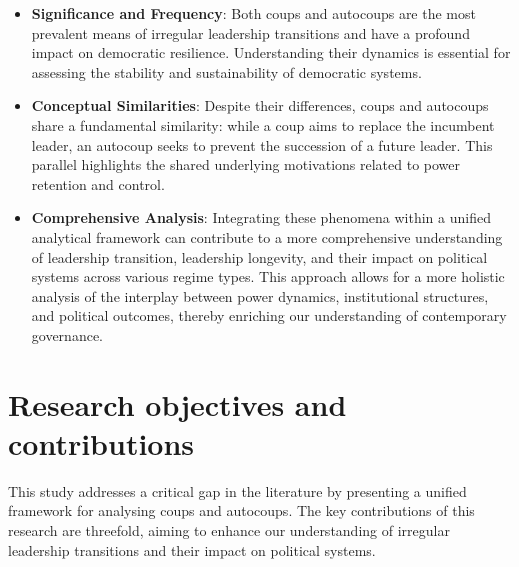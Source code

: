 \documentclass[
  12pt,
]{report}
\begin{document}
\begin{itemize}
\item
  \textbf{Significance and Frequency}: Both coups and autocoups are the
  most prevalent means of irregular leadership transitions and have a
  profound impact on democratic resilience. Understanding their dynamics
  is essential for assessing the stability and sustainability of
  democratic systems.
\item
  \textbf{Conceptual Similarities}: Despite their differences, coups and
  autocoups share a fundamental similarity: while a coup aims to replace
  the incumbent leader, an autocoup seeks to prevent the succession of a
  future leader. This parallel highlights the shared underlying
  motivations related to power retention and control.
\item
  \textbf{Comprehensive Analysis}: Integrating these phenomena within a
  unified analytical framework can contribute to a more comprehensive
  understanding of leadership transition, leadership longevity, and
  their impact on political systems across various regime types. This
  approach allows for a more holistic analysis of the interplay between
  power dynamics, institutional structures, and political outcomes,
  thereby enriching our understanding of contemporary governance.
\end{itemize}

\section{Research objectives and
contributions}\label{research-objectives-and-contributions}

This study addresses a critical gap in the literature by presenting a
unified framework for analysing coups and autocoups. The key
contributions of this research are threefold, aiming to enhance our
understanding of irregular leadership transitions and their impact on
political systems.
\end{document}
